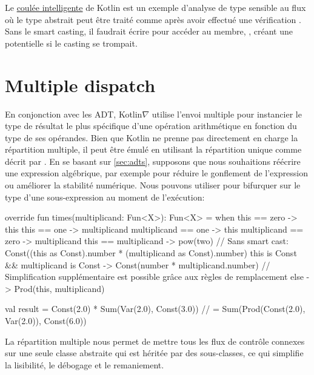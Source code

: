 %
Le \href{https://kotlinlang.org/docs/reference/typecasts.html#smart-casts}{coulée intelligente} de Kotlin est un exemple d'analyse de type sensible au flux~\citep{pearce2011implement} où le type abstrait  peut être traité comme  après avoir effectué une vérification . Sans le smart casting, il faudrait écrire  pour accéder au membre, , créant une  potentielle si le casting se trompait.

\section{Multiple dispatch}\label{sec:multiple-dispatch}

En conjonction avec les ADT, Kotlin$\nabla$ utilise l'envoi multiple pour instancier le type de résultat le plus spécifique d'une opération arithmétique en fonction du type de ses opérandes. Bien que Kotlin ne prenne pas directement en charge la répartition multiple, il peut être émulé en utilisant la répartition unique comme décrit par \citet{leavens1998multiple}. En se basant sur \autoref{sec:adts}, supposons que nous souhaitions réécrire une expression algébrique, par exemple pour réduire le gonflement de l'expression ou améliorer la stabilité numérique. Nous pouvons utiliser  pour bifurquer sur le type d'une sous-expression au moment de l'exécution:

\begin{kotlinlisting}
override fun times(multiplicand: Fun<X>): Fun<X> =
    when {
        this == zero -> this
        this == one -> multiplicand
        multiplicand == one -> this
        multiplicand == zero -> multiplicand
        this == multiplicand -> pow(two)
        // Sans smart cast: Const((this as Const).number * (multiplicand as Const).number)
        this is Const && multiplicand is Const -> Const(number * multiplicand.number)
        // Simplification supplémentaire est possible grâce aux règles de remplacement
        else -> Prod(this, multiplicand)
    }

val result = Const(2.0) * Sum(Var(2.0), Const(3.0))
//         = Sum(Prod(Const(2.0), Var(2.0)), Const(6.0))
\end{kotlinlisting}
%
La répartition multiple nous permet de mettre tous les flux de contrôle connexes sur une seule classe abstraite qui est héritée par des sous-classes, ce qui simplifie la lisibilité, le débogage et le remaniement.

